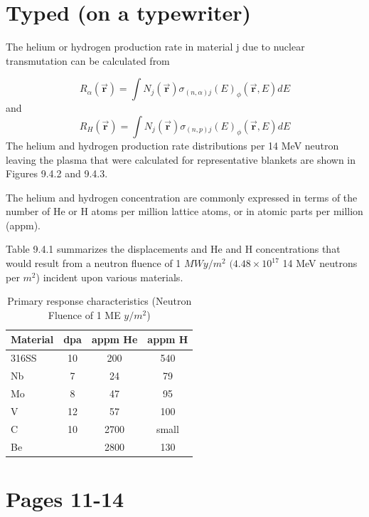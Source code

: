 \documentclass[11pt]{article}
\begin{document}
\section{Typed (on a typewriter)}

The helium or hydrogen production rate in material j due to nuclear transmutation can be calculated from

\begin{equation}
	R_{\alpha}(\vec{\mathbf{r}}) = \int N_j(\vec{\mathbf{r}}) \sigma_{(n,\alpha)j}(E)_{\phi}(\vec{\mathbf{r}},E) dE
\end{equation}
and
\begin{equation}
	R_{H}(\vec{\mathbf{r}}) = \int N_j(\vec{\mathbf{r}}) \sigma_{(n,p)j}(E)_{\phi}(\vec{\mathbf{r}},E) dE
\end{equation}
The helium and hydrogen production rate distributions per 14 MeV neutron leaving the plasma that were calculated for representative blankets are shown in Figures 9.4.2 and 9.4.3.

The helium and hydrogen concentration are commonly expressed in terms of the number of He or H atoms per million lattice atoms, or in atomic parts per million (appm).

Table 9.4.1 summarizes the displacements and He and H concentrations that would result from a neutron fluence of 1 $MW y/m^2$ $(4.48\times 10^{17}$ 14 MeV neutrons per $m^2$) incident upon various materials.
\begin{table}
\centering
\begin{tabular}{|lccc|}
\hline
Material & dpa & appm He & appm H \\
\hline
316SS & 10 & 200  & 540   \\
Nb    & 7  & 24   & 79    \\
Mo    & 8  & 47   & 95    \\
V     & 12 & 57   & 100   \\
C     & 10 & 2700 & small \\
Be    &    & 2800 & 130   \\
\hline
\end{tabular}
\caption{Primary response characteristics (Neutron Fluence of 1 ME $y/m^2$)}
\end{table}


\section{Pages 11-14}
\end{document}
